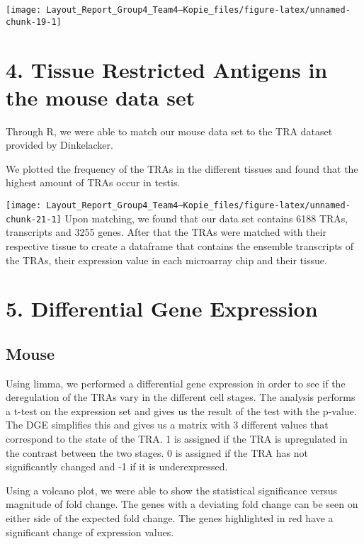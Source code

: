 \documentclass[
  parskip,
  oneside]{scrreprt}
\begin{document}
\texttt{[image: Layout\_Report\_Group4\_Team4---Kopie\_files/figure-latex/unnamed-chunk-19-1]}

\hypertarget{tissue-restricted-antigens-in-the-mouse-data-set}{%
\section{4. Tissue Restricted Antigens in the mouse data
set}\label{tissue-restricted-antigens-in-the-mouse-data-set}}

Through R, we were able to match our mouse data set to the TRA dataset
provided by Dinkelacker.

We plotted the frequency of the TRAs in the different tissues and found
that the highest amount of TRAs occur in testis.

\texttt{[image: Layout\_Report\_Group4\_Team4---Kopie\_files/figure-latex/unnamed-chunk-21-1]}
Upon matching, we found that our data set contains 6188 TRAs,
transcripts and 3255 genes. After that the TRAs were matched with their
respective tissue to create a dataframe that contains the ensemble
transcripts of the TRAs, their expression value in each microarray chip
and their tissue.

\hypertarget{differential-gene-expression}{%
\section{5. Differential Gene
Expression}\label{differential-gene-expression}}

\hypertarget{mouse-1}{%
\subsection{Mouse}\label{mouse-1}}

Using limma, we performed a differential gene expression in order to see
if the deregulation of the TRAs vary in the different cell stages. The
analysis performs a t-test on the expression set and gives us the result
of the test with the p-value. The DGE simplifies this and gives us a
matrix with 3 different values that correspond to the state of the TRA.
1 is assigned if the TRA is upregulated in the contrast between the two
stages. 0 is assigned if the TRA has not significantly changed and -1 if
it is underexpressed.

Using a volcano plot, we were able to show the statistical significance
versus magnitude of fold change. The genes with a deviating fold change
can be seen on either side of the expected fold change. The genes
highlighted in red have a significant change of expression values.
\end{document}

